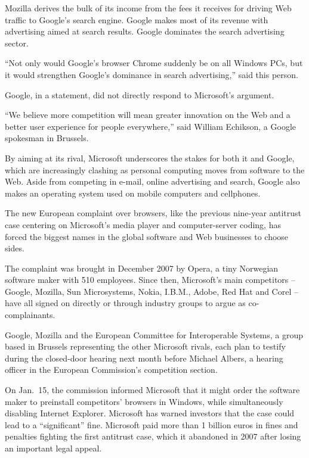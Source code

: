 \documentclass[12pt,a4paper,onecolumn]{article}
\begin{document}
Mozilla derives the bulk of its income from the fees it receives for driving Web traffic to Google's
search engine. Google makes most of its revenue with advertising aimed at search results. Google
dominates the search advertising sector.

``Not only would Google's browser Chrome suddenly be on all Windows PCs, but it would strengthen
Google's dominance in search advertising,'' said this person.

Google, in a statement, did not directly respond to Microsoft's argument.

``We believe more competition will mean greater innovation on the Web and a better user experience
for people everywhere,'' said William Echikson, a Google spokesman in Brussels.

By aiming at its rival, Microsoft underscores the stakes for both it and Google, which are
increasingly clashing as personal computing moves from software to the Web. Aside from competing in
e-mail, online advertising and search, Google also makes an operating system used on mobile
computers and cellphones.

The new European complaint over browsers, like the previous nine-year antitrust case centering on
Microsoft's media player and computer-server coding, has forced the biggest names in the global
software and Web businesses to choose sides.

The complaint was brought in December 2007 by Opera, a tiny Norwegian software maker with 510
employees. Since then, Microsoft's main competitors -- Google, Mozilla, Sun Microsystems, Nokia,
I.B.M., Adobe, Red Hat and Corel -- have all signed on directly or through industry groups to argue
as co-complainants.

Google, Mozilla and the European Committee for Interoperable Systems, a group based in Brussels
representing the other Microsoft rivals, each plan to testify during the closed-door hearing next
month before Michael Albers, a hearing officer in the European Commission's competition section.

On Jan.~15, the commission informed Microsoft that it might order the software maker to preinstall
competitors' browsers in Windows, while simultaneously disabling Internet Explorer. Microsoft has
warned investors that the case could lead to a ``significant'' fine. Microsoft paid more than 1
billion euros in fines and penalties fighting the first antitrust case, which it abandoned in 2007
after losing an important legal appeal.
\end{document}
